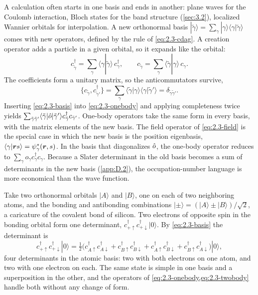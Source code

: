 A calculation often starts in one basis and ends in another: plane waves for the Coulomb interaction, Bloch states for the band structure (\cref{sec:3.2}), localized Wannier orbitals for interpolation. A new orthonormal basis $|\tilde\gamma\rangle = \sum_\gamma|\gamma\rangle\langle\gamma|\tilde\gamma\rangle$ comes with new operators, defined by the rule of \cref{eq:2.3-cdag}. A creation operator adds a particle in a given orbital, so it expands like the orbital:
\begin{equation}
  c^\dagger_{\tilde\gamma} = \sum_\gamma\langle\gamma|\tilde\gamma\rangle\,c^\dagger_\gamma , \qquad
  c_{\tilde\gamma} = \sum_\gamma\langle\tilde\gamma|\gamma\rangle\,c_\gamma .
  \label{eq:2.3-basis}
\end{equation}
The coefficients form a unitary matrix, so the anticommutators survive,
\begin{equation*}
  \{c_{\tilde\gamma}, c^\dagger_{\tilde\gamma'}\} = \sum_\gamma\langle\tilde\gamma|\gamma\rangle\langle\gamma|\tilde\gamma'\rangle = \delta_{\tilde\gamma\tilde\gamma'} .
\end{equation*}
Inserting \cref{eq:2.3-basis} into \cref{eq:2.3-onebody} and applying completeness twice yields $\sum_{\tilde\gamma\tilde\gamma'}\langle\tilde\gamma|\hat{o}|\tilde\gamma'\rangle c^\dagger_{\tilde\gamma}c_{\tilde\gamma'}$. One-body operators take the same form in every basis, with the matrix elements of the new basis. The field operator of \cref{eq:2.3-field} is the special case in which the new basis is the position eigenbasis, $\langle\gamma|\bm{r}s\rangle = \psi^*_\gamma(\bm{r}, s)$. In the basis that diagonalizes $\hat{o}$, the one-body operator reduces to $\sum_\gamma o_\gamma c^\dagger_\gamma c_\gamma$. Because a Slater determinant in the old basis becomes a sum of determinants in the new basis (\cref{app:D.2}), the occupation-number language is more economical than the wave function.

Take two orthonormal orbitals $|A\rangle$ and $|B\rangle$, one on each of two neighboring atoms, and the bonding and antibonding combinations $|\pm\rangle = (|A\rangle \pm |B\rangle)/\sqrt2$, a caricature of the covalent bond of silicon. Two electrons of opposite spin in the bonding orbital form one determinant, $c^\dagger_{+\uparrow}c^\dagger_{+\downarrow}|0\rangle$. By \cref{eq:2.3-basis} the determinant is
\begin{equation*}
  c^\dagger_{+\uparrow}c^\dagger_{+\downarrow}|0\rangle
  = \tfrac12\bigl(c^\dagger_{A\uparrow}c^\dagger_{A\downarrow} + c^\dagger_{B\uparrow}c^\dagger_{B\downarrow}
  + c^\dagger_{A\uparrow}c^\dagger_{B\downarrow} + c^\dagger_{B\uparrow}c^\dagger_{A\downarrow}\bigr)|0\rangle ,
\end{equation*}
four determinants in the atomic basis: two with both electrons on one atom, and two with one electron on each. The same state is simple in one basis and a superposition in the other, and the operators of \cref{eq:2.3-onebody,eq:2.3-twobody} handle both without any change of form.

